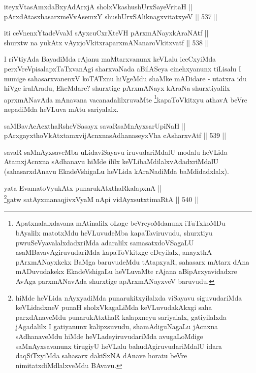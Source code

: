 
\begin{shl}
iteyxVtasAmxdaBxyAdArxjA sholxVkashushUrxSayeVritaH || \\
pArxdAtasxhasarxmeVvAsemxY shushUrxSAliknagxvitatxyeV \hfill || 537 ||  
\end{shl}

\begin{shl}
iti ceVnenxYtadeVvaM sAyxcuCxrXteVH pArxmANayxkAraNAtf || \\
shurxtw na yukAtx vAyxjoVkitxraparxmANanaroVkitxvatf \hfill || 538 ||  
\end{shl}

\begin{artha}
I riVtiyAda BayadiMda rAjanu maMtarxvanunx keVLalu iceCxyiMda
perxVreVpisalapxTaTxvanAgi sharxvaNada aBilASeya cinehxyanunx tiLisalu
I munige sahasarxvanenxV koTATxnu hiVgeMdu shaMke mADidare - utatxra
idu hiVge iralAradu, EkeMdare? shurxtige pArxmANayx kAraNa
shurxtiyalilx aprxmANavAda mAnavana vacanadalilxruvaMte \footnote{Apatxnalalxdavana mAtinalilx oLage
beVreyoMdanunx iTuTxkoMDu bAyalilx matotxMdu heVLuvudeMba
kapaTaviruvudu, shurxtiyu pwruSeVyavalalxdadxriMda adaralilx
samasatxdoVSagaLU asaMBavavAgiruvudariMda kapaToVkitxge eDeyilalx,
anayxthA pArxmANayxkekx BaMga baruvudeMdu tAtapxyaR, sahasarx mAtarx
dAna mADuvudakekx EkadeVshigaLu heVLuvaMte rAjana aBipArxyavidadxre
AvAga parxmANavAda shurxtige apArxmANayxveV baruvudu.}kapaToVkitxyu athavA beVre nepadiMda
heVLuva mAtu sariyalalx.
\end{artha}


\begin{shl}
saMBavAcAcxthaRsheVSasayx savaRsaMnAyxsarUpiNaH || \\
pArxgayxthoVkAtxtamxvijAcnxnasAdhanaseyxVha cAsharxvAtf \hfill || 539 ||  
\end{shl}

\begin{artha}
savaR saMnAyxsaveMba uLidaviSayavu iruvudariMdalU modalu heVLida
AtamxjAcnxna sAdhanavu hiMde ililx keVLibaMdilalxvAdadxriMdalU
(sahasarxdAnavu EkadeVshigaLu heVLida kAraNadiMda baMdidadxlalx).
\end{artha}

\begin{shl}
yata EvamatoV\s yukAtx punarukAtxthaRkalapxnA || \\
\footnote{hiMde heVLida nAyxyadiMda punarukitxyilalxda viSayavu
siguvudariMda keVLidadxneV punaH sholxVkagaLiMda keVLuvudakAkxgi
saha parxdAnaveMdu punarukAtxthaR kalapxneyu sariyalalx,
gatiyilalxda jAgadalilx I gatiyanunx kalipxsuvudu, shamAdiguNagaLu
jAcnxna sAdhanaveMdu hiMde heVLadeyiruvudariMda avugaLoMdige
saMnAyxsavanunx tirugiyU heVLalu bahudAgiruvudariMdalU idara
daqSiTxyiMda sahasarx dakiSxNA dAnave horatu beVre 
nimitatxdiMdlalxveMdu BAvavu.}gatw satAyxmanaqjivxVyaM nApi vidAyxsutxtimaRtA \hfill || 540 ||  
\end{shl}



